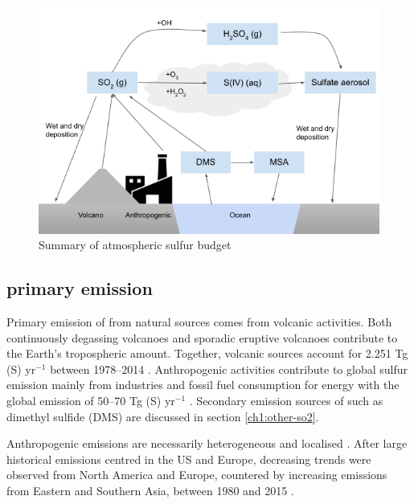 \begin{figure}
    \centering
    \includegraphics[width=6in]{Chapter1/figs/sulfur_budget.png}
    \caption[Summary of atmospheric sulfur budget]{Summary of atmospheric sulfur budget}
    \label{fig:sulfur-budget}
\end{figure}

\subsection{ primary emission}

Primary emission of  from natural sources comes from volcanic activities. Both continuously degassing volcanoes and sporadic eruptive volcanoes contribute to the Earth's tropospheric  amount. Together, volcanic sources account for 2.251  Tg (S) yr$^{-1}$ between 1978--2014 \citep{carnMultidecadalSatelliteMeasurements2016}. Anthropogenic activities contribute to global sulfur emission mainly from industries and fossil fuel consumption for energy with the global emission of 50--70 Tg (S) yr$^{-1}$ \citep{forsterEarthEnergyBudget2021}. Secondary emission sources of   such as dimethyl sulfide (DMS) are discussed in section \ref{ch1:other-so2}.

Anthropogenic  emissions are necessarily heterogeneous and localised \citep{manktelowRegionalGlobalTrends2007}. After large historical emissions centred in the US and Europe, decreasing trends were observed from North America and Europe, countered by increasing emissions from Eastern and Southern Asia, between 1980 and 2015 \citep{szopaShortlivedClimateForcers2021, aasGlobalRegionalTrends2019}. 




